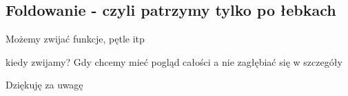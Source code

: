 \documentclass{beamer}
\begin{document}
\subsection{Foldowanie - czyli patrzymy tylko po łebkach}
\begin{frame}
	{
		Możemy zwijać funkcje, pętle itp\\
	}
	\uncover<2->
	{
		\begin{block}{kiedy zwijamy?}
			Gdy chcemy mieć pogląd całości a nie zagłębiać się w szczegóły
		\end{block}
	}
\end{frame}
\begin{frame}
	Dziękuję za uwagę
\end{frame}
\end{document}
